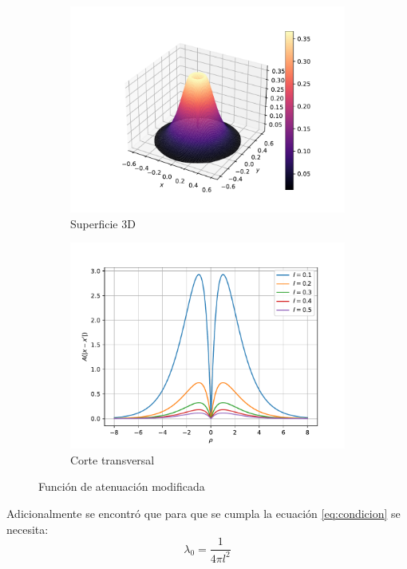 \begin{figure}
    \centering
    \sffamily
    \begin{subfigure}{0.48\textwidth}
    \centering
        \includegraphics[width=\textwidth]{figuras/modificada3d.pdf}
        \caption{Superficie 3D}
        \label{fig:modificada.3d}
    \end{subfigure}
    \begin{subfigure}{0.48\textwidth}
    \centering
        \includegraphics[width=\textwidth]{figuras/modificada2dl.pdf}
        \caption{Corte transversal}
        \label{fig:modificada.sublabel}
    \end{subfigure}
    \caption{Función de atenuación modificada}
    \label{fig:modificada}
\end{figure}

Adicionalmente se encontró que para que se cumpla la ecuación \ref{eq:condicion} se necesita:
\begin{equation}
	\lambda_0=\frac{1}{4\pi l^2}
\end{equation}
